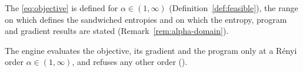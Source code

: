 
The  \eqref{eq:objective} is defined for
$\alpha\in(1,\infty)$ (Definition~\ref{def:feasible}), the range on which
 defines the sandwiched entropies and on which
the entropy, program and gradient results are stated
(Remark~\ref{rem:alpha-domain}).

\begin{requirement}\label{req:objective-alpha-domain}
The engine evaluates the objective, its gradient and the program only at a
R\'enyi order $\alpha\in(1,\infty)$, and refuses any other order
().
\end{requirement}
